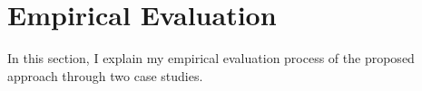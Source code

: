 \chapter{Empirical Evaluation} \label{sec:experiment}
In this section, I explain my empirical evaluation process of the proposed approach through two case studies.




